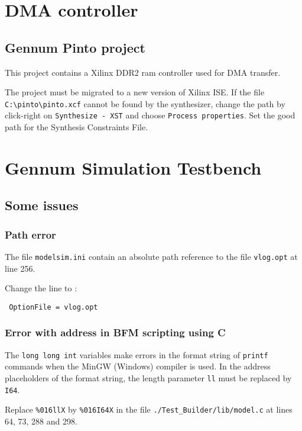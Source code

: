 \documentclass[10pt,a4paper]{cerndoc}
\begin{document}
\section{DMA controller}
  \subsection{Gennum Pinto project}
This project contains a Xilinx DDR2 ram controller used for DMA transfer.

The project must be migrated to a new version of Xilinx ISE.
If the file \verb+C:\pinto\pinto.xcf+ cannot be found by the synthesizer, change the path by click-right on \verb+Synthesize - XST+ and choose \verb+Process properties+. Set the good path for the Synthesis Constraints File.
  

\section{Gennum Simulation Testbench}
  \subsection{Some issues}
    \subsubsection{Path error}
The file \verb+modelsim.ini+ contain an absolute path reference to the file \verb+vlog.opt+ at line 256.

Change the line to :
\begin{lstlisting}
 OptionFile = vlog.opt
\end{lstlisting}
	
    \subsubsection{Error with address in BFM scripting using C}
The \verb+long long int+ variables make errors in the format string of \verb+printf+ commands when the MinGW (Windows) compiler is used. 
In the address placeholders of the format string, the length parameter \verb+ll+ must be replaced by \verb+I64+.

Replace \verb+%016llX+
by \verb+%016I64X+ 
in the file \verb+./Test_Builder/lib/model.c+ at lines 64, 73, 288 and 298.
\end{document}
